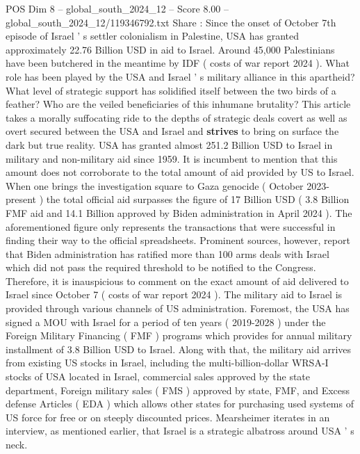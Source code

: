 \begin{textsample}{POS Dim 8 – global\_south\_2024\_12 – Score 8.00 – global\_south\_2024\_12/119346792.txt}  \label{ex:f8_pos_066}
Share : Since the onset of October 7th episode of Israel ' s settler colonialism in Palestine, USA has granted approximately 22.76 Billion USD in aid to Israel.
Around 45,000 Palestinians have been butchered in the meantime by IDF ( costs of war report 2024 ).
What role has been played by the USA and Israel ' s military alliance in this apartheid?
What level of strategic support has solidified itself between the two birds of a feather?
Who are the veiled beneficiaries of this inhumane brutality?
This article takes a morally suffocating ride to the depths of strategic deals covert as well as overt secured between the USA and Israel and \textbf{strives} to bring on surface the dark but true reality.
USA has granted almost 251.2 Billion USD to Israel in military and non-military aid since 1959.
It is incumbent to mention that this amount does not corroborate to the total amount of aid provided by US to Israel.
When one brings the investigation square to Gaza genocide ( October 2023-present ) the total official aid surpasses the figure of 17 Billion USD ( 3.8 Billion FMF aid and 14.1 Billion approved by Biden administration in April 2024 ).
The aforementioned figure only represents the transactions that were successful in finding their way to the official spreadsheets.
Prominent sources, however, report that Biden administration has ratified more than 100 arms deals with Israel which did not pass the required threshold to be notified to the Congress.
Therefore, it is inauspicious to comment on the exact amount of aid delivered to Israel since October 7 ( costs of war report 2024 ).
The military aid to Israel is provided through various channels of US administration.
Foremost, the USA has signed a MOU with Israel for a period of ten years ( 2019-2028 ) under the Foreign Military Financing ( FMF ) programs which provides for annual military installment of 3.8 Billion USD to Israel.
Along with that, the military aid arrives from existing US stocks in Israel, including the multi-billion-dollar WRSA-I stocks of USA located in Israel, commercial sales approved by the state department, Foreign military sales ( FMS ) approved by state, FMF, and Excess defense Articles ( EDA ) which allows other states for purchasing used systems of US force for free or on steeply discounted prices.
Mearsheimer iterates in an interview, as mentioned earlier, that Israel is a strategic albatross around USA ' s neck.

\end{textsample}
